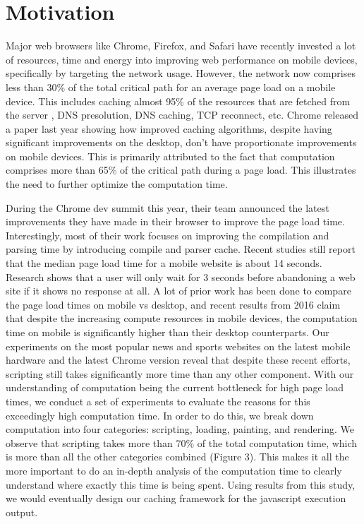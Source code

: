 \section{Motivation}
\label{sec:motivation}


Major web browsers like Chrome, Firefox, and Safari have recently invested a lot of resources,
time and energy into improving web performance on mobile devices, specifically by targeting 
the network usage. However, the network now comprises less than 30\% \cite{njait2016www} of the total critical
path for an average page load on a mobile device. This includes caching almost 95\% of the
resources that are fetched from the server \cite{vesuna2016caching}, DNS presolution, DNS caching, TCP reconnect, etc.
Chrome released a paper last year showing how improved caching algorithms, despite having 
significant improvements on the desktop, don't have proportionate improvements 
on mobile devices. This is primarily attributed to the fact that computation comprises more than 65\%
of the critical path during a page load. This illustrates the need to further optimize the computation 
time. 

During the Chrome dev summit this year, their team announced the latest improvements they have 
made in their browser to improve the page load time. Interestingly, most of their work focuses on
improving the compilation and parsing time by introducing compile and parser cache. 
Recent studies \cite{url4} still report that the median page load time for a mobile website 
is about 14 seconds. Research \cite{url4} shows that a user will only wait for 3 seconds 
before abandoning a web site if it shows no response at all. A lot of prior work \cite {njait2016www}
has been done to compare the page load times on mobile vs desktop, and recent results
from 2016 claim that despite the increasing compute resources in mobile devices,
the computation time on mobile is significantly higher than their desktop counterparts. 
 Our experiments
on the most popular news and sports websites on the latest mobile hardware and the latest 
Chrome version reveal that despite these recent efforts, scripting still takes significantly more
time than any other component. With our understanding of 
computation being the current bottleneck for high page load times, 
we conduct a set of experiments to evaluate the reasons for this
exceedingly high computation time. In order to do this, we break down computation
into four categories: scripting, loading, painting, and rendering. We observe that scripting takes more than 70\% of the total
computation time, which is more than all the other categories combined (Figure 3). 
This makes it all the more important to do an in-depth analysis of the computation time to clearly
understand where exactly this time is being spent. Using results from this study, we would eventually
design our caching framework for the javascript execution output. 
